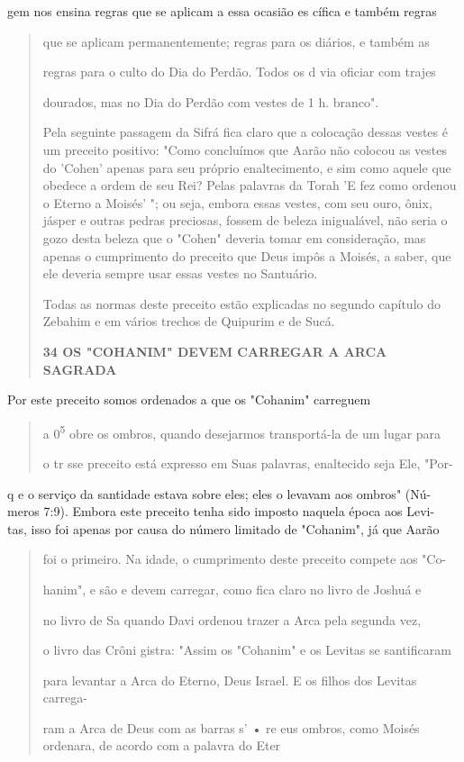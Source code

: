gem nos ensina regras que se aplicam a essa ocasião es cífica e também
regras

\begin{quote}
que se aplicam permanentemente; regras para os diários, e também as

regras para o culto do Dia do Perdão. Todos os d via oficiar com trajes

dourados, mas no Dia do Perdão com vestes de 1 h. branco".

Pela seguinte passagem da Sifrá fica claro que a colocação dessas
ves­tes é um preceito positivo: "Como concluímos que Aarão não colocou
as ves­tes do 'Cohen' apenas para seu próprio enaltecimento, e sim como
aquele que obedece a ordem de seu Rei? Pelas palavras da Torah 'E fez
como ordenou o Eterno a Moisés' "; ou seja, embora essas vestes, com seu
ouro, ônix, jásper e outras pedras preciosas, fossem de beleza
inigualável, não seria o gozo desta beleza que o "Cohen" deveria tomar
em consideração, mas apenas o cumpri­mento do preceito que Deus impôs a
Moisés, a saber, que ele deveria sempre usar essas vestes no Santuário.

Todas as normas deste preceito estão explicadas no segundo capítu­lo do
Zebahim e em vários trechos de Quipurim e de Sucá.

\textbf{34 OS "COHANIM" DEVEM CARREGAR A ARCA SAGRADA}
\end{quote}

Por este preceito somos ordenados a que os "Cohanim" carreguem

\begin{quote}
a 0\textsuperscript{5} obre os ombros, quando desejarmos transportá-la
de um lugar para

o tr sse preceito está expresso em Suas palavras, enaltecido seja Ele,
"Por-
\end{quote}

q e o serviço da santidade estava sobre eles; eles o levavam aos ombros"
(Nú-\\
meros 7:9). Embora este preceito tenha sido imposto naquela época aos
Levi-\\
tas, isso foi apenas por causa do número limitado de "Cohanim", já que
Aarão

\begin{quote}
foi o primeiro. Na idade, o cumprimento deste preceito compete aos "Co-

hanim", e são e devem carregar, como fica claro no livro de Joshuá e

no livro de Sa quando Davi ordenou trazer a Arca pela segunda vez,

o livro das Crôni gistra: "Assim os "Cohanim" e os Levitas se
santificaram

para levantar a Arca do Eterno, Deus Israel. E os filhos dos Levitas
carrega-

ram a Arca de Deus com as barras s' • re eus ombros, como Moisés
ordenara, de acordo com a palavra do Eter
\end{quote}

